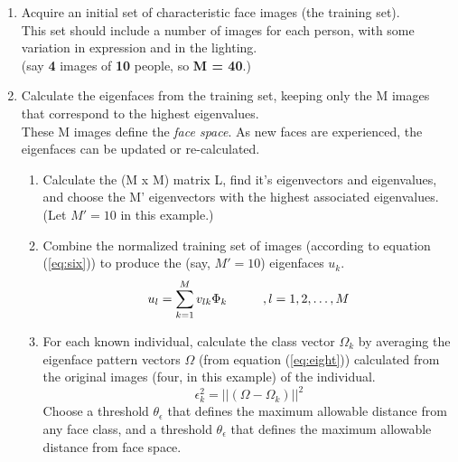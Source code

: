 \begin{enumerate}
  \item Acquire an initial set of characteristic face images (the training set). \\
        This set should include a number of images for each person, with some
        variation in expression and in the lighting. \\
        (say \textbf{4} images of \textbf{10} people, so \textbf{M = 40}.)
  \item Calculate the eigenfaces from the training set, keeping only the M images
        that correspond to the highest eigenvalues. \\
        These M images define the \textit{face space}. As new faces are experienced,
        the eigenfaces can be updated or re-calculated.
        \begin{enumerate}
          \item Calculate the (M x M) matrix L, find it's eigenvectors and
                eigenvalues, and choose the M' eigenvectors with the highest
                associated eigenvalues. \\
                (Let $ M' = 10 $ in this example.)
          \item Combine the normalized training set of images (according to
                equation (\ref{eq:six})) to produce the (say, $ M' = 10 $) eigenfaces $ u_{k} $. \\
                \begin{equation} \label{eq:six}
                  u_{l} = \sum_{k = 1}^{M} v_{lk}\Phi_{k} \hspace{10 mm}, l = 1,2,\ldots,M
                \end{equation}
          \item For each known individual, calculate the class vector $ \Omega_{k} $
                by averaging the eigenface pattern vectors $ \Omega $ (from equation (\ref{eq:eight}))
                calculated from the original images (four, in this example) of the individual. \\
                \begin{equation} \label{eq:eight}
                  \epsilon_{k}^{2} = || (\Omega - \Omega_{k}) ||^{2}
                \end{equation}
                Choose a threshold $ \theta_{\epsilon} $ that defines the maximum
                allowable distance from any face class, and a threshold $ \theta_{\epsilon} $
                that defines the maximum allowable distance from face space.

\end{enumerate}
\end{enumerate}
